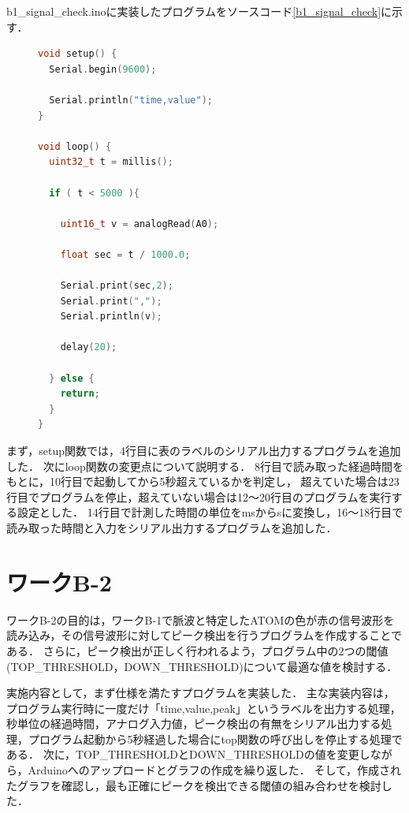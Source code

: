 b1\_signal\_check.inoに実装したプログラムをソースコード\ref{b1_signal_check}に示す．

\begin{figure}[H]
    \begin{lstlisting}[caption=b1\_signal\_check.ino, label=b1_signal_check, escapechar=\@, language=c++]
void setup() {
  Serial.begin(9600);

  Serial.println("time,value");
}

void loop() {
  uint32_t t = millis();

  if ( t < 5000 ){

    uint16_t v = analogRead(A0);

    float sec = t / 1000.0;

    Serial.print(sec,2);
    Serial.print(",");
    Serial.println(v);

    delay(20);

  } else {
    return;
  }
}
    \end{lstlisting}
\end{figure}
まず，setup関数では，4行目に表のラベルのシリアル出力するプログラムを追加した．
次にloop関数の変更点について説明する．
8行目で読み取った経過時間をもとに，10行目で起動してから5秒超えているかを判定し，
超えていた場合は23行目でプログラムを停止，超えていない場合は12〜20行目のプログラムを実行する設定とした．
14行目で計測した時間の単位をmsからsに変換し，16〜18行目で読み取った時間と入力をシリアル出力するプログラムを追加した．


\newpage

\section{ワークB-2}
ワークB-2の目的は，ワークB-1で脈波と特定したATOMの色が赤の信号波形を読み込み，その信号波形に対してピーク検出を行うプログラムを作成することである．
さらに，ピーク検出が正しく行われるよう，プログラム中の2つの閾値(TOP\_THRESHOLD，DOWN\_THRESHOLD)について最適な値を検討する．

実施内容として，まず仕様を満たすプログラムを実装した．
主な実装内容は，プログラム実行時に一度だけ「time,value,peak」というラベルを出力する処理，
秒単位の経過時間，アナログ入力値，ピーク検出の有無をシリアル出力する処理，プログラム起動から5秒経過した場合にtop関数の呼び出しを停止する処理である．
次に，TOP\_THRESHOLDとDOWN\_THRESHOLDの値を変更しながら，Arduinoへのアップロードとグラフの作成を繰り返した．
そして，作成されたグラフを確認し，最も正確にピークを検出できる閾値の組み合わせを検討した．

